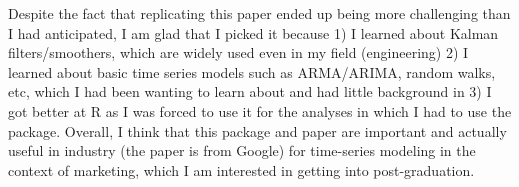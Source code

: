 \documentclass[12pt]{article}
\begin{document}
Despite the fact that replicating this paper ended up being more challenging than I had anticipated, I am glad that I picked it because 1) I learned about Kalman filters/smoothers, which are widely used even in my field (engineering) 2) I learned about basic time series models such as ARMA/ARIMA, random walks, etc, which I had been wanting to learn about and had little background in 3) I got better at R as
I was forced to use it for the analyses in which I had to use the package. Overall, I think that this package and paper are important and actually useful in industry (the paper is from Google) for time-series modeling in the context of marketing, which  I am interested in getting into post-graduation.





\clearpage
 

\end{document}
